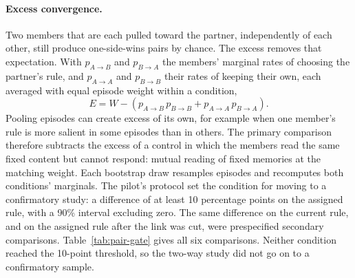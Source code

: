 \paragraph{Excess convergence.}
Two members that are each pulled toward the partner, independently of
each other, still produce one-side-wins pairs by chance. The excess
removes that expectation. With $p_{A\to B}$ and $p_{B\to A}$ the members'
marginal rates of choosing the partner's rule, and $p_{A\to A}$ and
$p_{B\to B}$ their rates of keeping their own, each averaged with equal
episode weight within a condition,
\begin{equation}
E=W-\left(p_{A\to B}\,p_{B\to B}+p_{A\to A}\,p_{B\to A}\right).
\label{eq:pair-excess}
\end{equation}
Pooling episodes can create excess of its own, for example when one
member's rule is more salient in some episodes than in others. The
primary comparison therefore subtracts the excess of a control in which
the members read the same fixed content but cannot respond: mutual
reading of fixed memories at the matching weight. Each bootstrap draw
resamples episodes and recomputes both conditions' marginals. The
pilot's protocol set the condition for moving to a confirmatory study:
a difference of at least 10 percentage points on the assigned rule, with
a 90\% interval excluding zero. The same difference on the current
rule, and on the assigned rule after the link was cut, were
prespecified secondary comparisons. Table~\ref{tab:pair-gate} gives all
six comparisons. Neither condition reached the 10-point threshold, so
the two-way study did not go on to a confirmatory sample.

